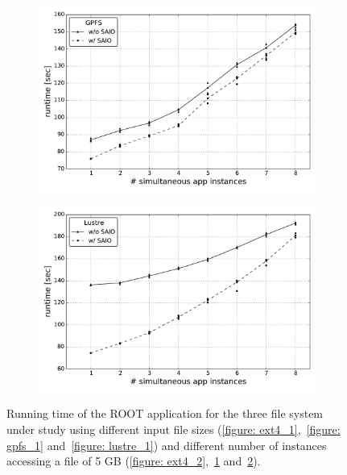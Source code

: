 \begin{figure}[!htb]
\begin{subfigure}[b]{0.32\textwidth}
    \includegraphics[width=\textwidth]{chapters/chapter2/figures/SC2015/ROOT/cluster/multiple_instances/simult_instance_gpfs_test_cluster}
    \caption{\textit{}}
    \label{figure: gpfs_2}
  \end{subfigure}
  \begin{subfigure}[b]{0.32\textwidth}
    \centering
    \includegraphics[width=\textwidth]{chapters/chapter2/figures/SC2015/ROOT/cluster/multiple_instances/multiple_simult_procs_Lustre_testcluster}
    \caption{\textit{}}
    \label{figure: lustre_2}
  \end{subfigure}
  \caption{Running time of the ROOT application for the three file system under study using different input file sizes (\ref{figure: ext4_1},~\ref{figure: gpfs_1} and~\ref{figure: lustre_1}) 
  and different number of instances accessing a file of 5 GB (\ref{figure: ext4_2},~\ref{figure: gpfs_2} and~\ref{figure: lustre_2}).}
  \label{figure: runtime}
\end{figure}
